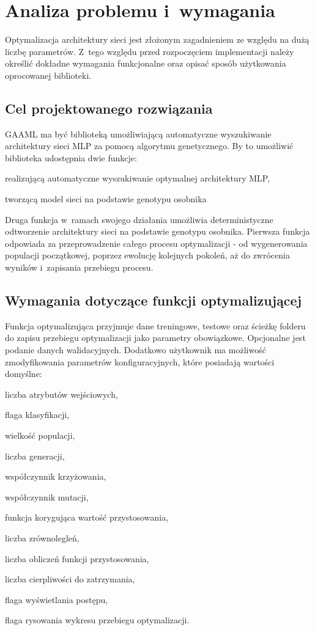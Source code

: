 \chapter{Analiza problemu i~wymagania}
\label{chap:prob_and_req}
Optymalizacja architektury sieci jest złożonym
zagadnieniem ze względu na dużą liczbę parametrów.
Z~tego względu przed rozpoczęciem implementacji
należy określić dokładne wymagania funkcjonalne
oraz opisać sposób użytkowania oprocowanej biblioteki.

\section{Cel projektowanego rozwiązania}
\gls{GAAML} ma być biblioteką umożliwiającą automatyczne
wyszukiwanie architektury sieci \gls{MLP}
za pomocą algorytmu genetycznego.
By to umożliwić biblioteka udostępnia dwie funkcje:
\begin{nospitemize}
  \item realizującą automatyczne wyszukiwanie
    optymalnej architektury \gls{MLP},
  \item tworzącą model sieci na podstawie
    genotypu osobnika
\end{nospitemize}

Druga funkcja w~ramach swojego działania umożliwia
deterministyczne odtworzenie architektury sieci
na podstawie genotypu osobnika.
Pierwsza funkcja odpowiada za przeprowadzenie
całego procesu optymalizacji
- od wygenerowania populacji początkowej,
poprzez ewolucję kolejnych pokoleń,
aż do zwrócenia wyników i~zapisania przebiegu procesu.

\section{Wymagania dotyczące funkcji optymalizującej}
Funkcja optymalizująca przyjmuje dane treningowe,
testowe oraz ścieżkę folderu do zapisu przebiegu
optymalizacji jako parametry obowiązkowe.
Opcjonalne jest podanie danych walidacyjnych.
Dodatkowo użytkownik ma możliwość
zmodyfikowania parametrów konfiguracyjnych,
które posiadają wartości domyślne:
\begin{nospitemize}
  \item liczba atrybutów wejściowych,
  \item flaga klasyfikacji,
  \item wielkość populacji,
  \item liczba generacji,
  \item współczynnik krzyżowania,
  \item współczynnik mutacji,
  \item funkcja korygująca wartość przystosowania,
  \item liczba zrównolegleń,
  \item liczba obliczeń funkcji przystosowania,
  \item liczba cierpliwości do zatrzymania,
  \item flaga wyświetlania postępu,
  \item flaga rysowania wykresu przebiegu optymalizacji.
\end{nospitemize}

